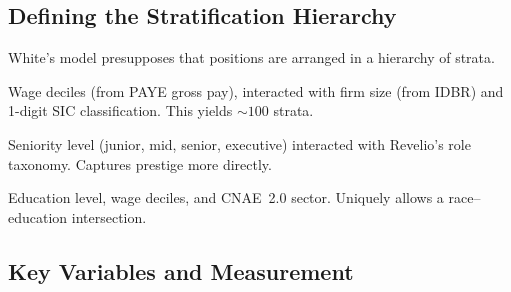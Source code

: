 \documentclass[a4paper]{tufte-handout}
\begin{document}
\subsection{Defining the Stratification Hierarchy}

White's model presupposes that positions are arranged in a hierarchy of
strata.

\begin{description}[style=nextline, font=\normalfont\itshape]
	\item[LEED strata]
	      Wage deciles (from PAYE gross pay), interacted with firm size (from IDBR) and 1-digit SIC classification. This yields ${\sim}100$ strata.
	\item[Revelio strata]
	      Seniority level (junior, mid, senior, executive) interacted with Revelio's role taxonomy. Captures prestige more directly.
	\item[RAIS strata]
	      Education level, wage deciles, and CNAE~2.0 sector. Uniquely allows a race--education intersection.
\end{description}


\subsection{Key Variables and Measurement}
\end{document}
